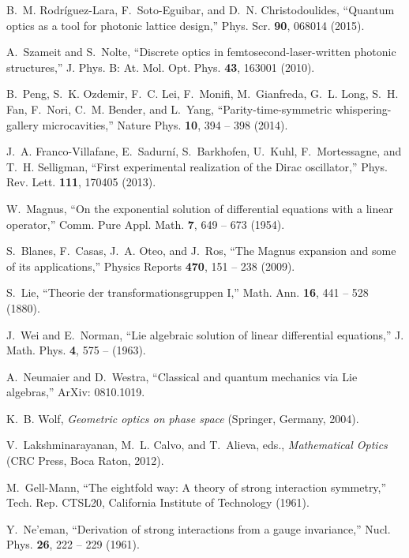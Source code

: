 \documentclass[9pt,twocolumn,twoside]{osajnl}
\begin{document}
\begin{thebibliography}{10}
B.~M. Rodr\'iguez-Lara, F.~Soto-Eguibar, and D.~N. Christodoulides,
  \enquote{Quantum optics as a tool for photonic lattice design,} Phys. Scr.
  \textbf{90}, 068014 (2015).

A.~Szameit and S.~Nolte, \enquote{Discrete optics in femtosecond-laser-written
  photonic structures,} J. Phys. B: At. Mol. Opt. Phys. \textbf{43}, 163001
  (2010).

B.~Peng, S.~K. Ozdemir, F.~C. Lei, F.~Monifi, M.~Gianfreda, G.~L. Long, S.~H.
  Fan, F.~Nori, C.~M. Bender, and L.~Yang, \enquote{Parity-time-symmetric
  whispering-gallery microcavities,} Nature Phys. \textbf{10}, 394 -- 398
  (2014).

J.~A. Franco-Villafane, E.~Sadurn\'{i}, S.~Barkhofen, U.~Kuhl, F.~Mortessagne,
  and T.~H. Selligman, \enquote{First experimental realization of the Dirac
  oscillator,} Phys. Rev. Lett. \textbf{111}, 170405 (2013).

W.~Magnus, \enquote{On the exponential solution of differential equations with
  a linear operator,} Comm. Pure Appl. Math. \textbf{7}, 649 -- 673 (1954).

S.~Blanes, F.~Casas, J.~A. Oteo, and J.~Ros, \enquote{The Magnus expansion and
  some of its applications,} Physics Reports \textbf{470}, 151 -- 238 (2009).

S.~Lie, \enquote{Theorie der transformationsgruppen I,} Math. Ann. \textbf{16},
  441 -- 528 (1880).

J.~Wei and E.~Norman, \enquote{Lie algebraic solution of linear differential
  equations,} J. Math. Phys. \textbf{4}, 575 -- (1963).

A.~Neumaier and D.~Westra, \enquote{Classical and quantum mechanics via Lie
  algebras,} ArXiv: 0810.1019.

K.~B. Wolf, \emph{Geometric optics on phase space} (Springer, Germany, 2004).

V.~Lakshminarayanan, M.~L. Calvo, and T.~Alieva, eds., \emph{Mathematical
  Optics} (CRC Press, Boca Raton, 2012).

M.~Gell-Mann, \enquote{The eightfold way: A theory of strong interaction
  symmetry,} Tech. Rep. CTSL20, California Institute of Technology (1961).

Y.~Ne'eman, \enquote{Derivation of strong interactions from a gauge
  invariance,} Nucl. Phys. \textbf{26}, 222 -- 229 (1961).


\end{thebibliography}
\end{document}
